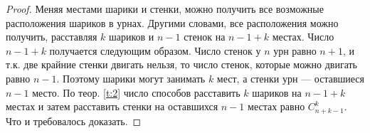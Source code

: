 \begin{proof}
Меняя местами шарики и стенки, можно получить все возможные расположения шариков в урнах. Другими словами, все расположения можно
получить, расставляя $k$ шариков и $n − 1$ стенок на $n − 1 + k$ местах. Число
$n−1+k$ получается следующим образом. Число стенок у $n$ урн равно $n+1$,
и т.к. две крайние стенки двигать нельзя, то число стенок, которые можно
двигать равно $n − 1$. Поэтому шарики могут занимать $k$ мест, а стенки урн
— оставшиеся $n−1$ место. По теор. \ref{t:2} число способов расставить $k$ шариков
на $n − 1 + k$ местах и затем расставить стенки на оставшихся $n − 1$ местах
равно $C^k_{n+k-1}$. Что и требовалось доказать.
\end{proof}
